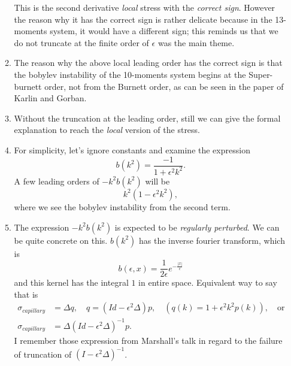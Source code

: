 \documentclass[a4paper,12pt]{article}
\begin{document}
\begin{enumerate}
\begin{enumerate}
 This is the second derivative {\it local} stress with the {\it correct sign}. However the reason why it has the correct sign is rather delicate because in the 13-moments system, it would have a different sign; this reminds us that we do not truncate at the finite order of $\epsilon$ was the main theme.
 \item The reason why the above local leading order has the correct sign is that the bobylev instability of the 10-moments system begins at the Super-burnett order, not from the Burnett order, as can be seen in the paper of Karlin and Gorban. 
 
 \item Without the truncation at the leading order, still we can give the formal explanation to reach the {\it local} version of the stress.
 
 \item For simplicity, let's ignore constants and examine the expression 
 $$b(k^2) = \frac{-1}{1+\epsilon^2 k^2}.$$ A few leading orders of $-k^2b(k^2)$ will be
 $$ k^2(1 - \epsilon^2k^2),$$
 where we see the bobylev instability from the second term.
 \item The expression $-k^2b(k^2)$ is expected to be {\it regularly perturbed}. We can be quite concrete on this. $b(k^2)$ has the inverse fourier transform, which is 
$$ b(\epsilon,x) = \frac{1}{2\epsilon} e^{-\frac{|x|}{\epsilon}} $$
and this kernel has the integral $1$ in entire space. Equivalent way to say that is 
\begin{align*}
 \sigma_{capillary} &= \Delta q, \quad q = (Id - \epsilon^2 \Delta) p, \quad (q(k) = 1+\epsilon^2k^2 p(k)), \quad \text{or}\\
 \sigma_{capillary} &= \Delta(Id - \epsilon^2 \Delta)^{-1} p.
\end{align*}
I remember those expression from Marshall's talk in regard to the failure of truncation of $(I-\epsilon^2 \Delta)^{-1}$. 


\end{enumerate}
\end{enumerate}
\end{document}
